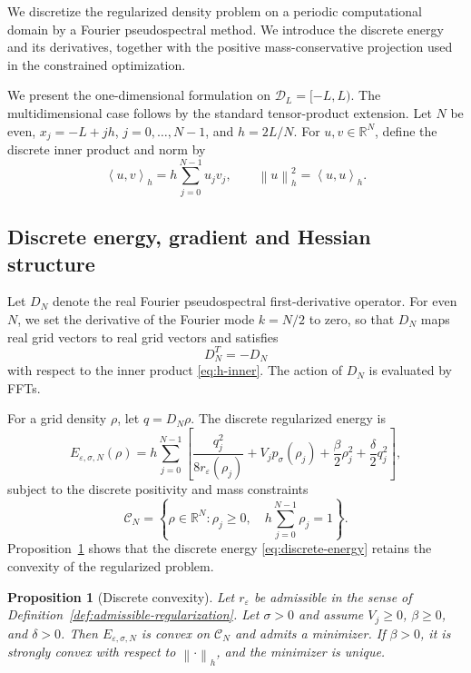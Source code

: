 \documentclass[11pt]{article}
\newcommand{\R}{\mathbb{R}}
\newcommand{\CN}{\mathcal{C}_N}
\newcommand{\eps}{\varepsilon}
\newcommand{\sig}{\sigma}
\newcommand{\inner}[2]{\left\langle #1,#2\right\rangle}
\newcommand{\norm}[1]{\left\|#1\right\|}
\theoremstyle{plain}
\newtheorem{proposition}[theorem]{Proposition}
\theoremstyle{definition}
\numberwithin{equation}{section}
\begin{document}
We discretize the regularized density problem on a periodic
computational domain by a Fourier pseudospectral method. We introduce
the discrete energy and its derivatives, together with the positive
mass-conservative projection used in the constrained optimization.

We present the one-dimensional formulation on $\mathcal D_L=[-L,L)$.
The multidimensional case follows by the standard tensor-product
extension. Let $N$ be even,
$x_j=-L+jh$, $j=0,\ldots,N-1$, and $h=2L/N$. For
$u,v\in\R^N$, define the discrete inner product and norm by
\begin{equation}
\label{eq:h-inner}
\inner{u}{v}_h
=
h\sum_{j=0}^{N-1}u_jv_j,
\qquad
\norm{u}_h^2=\inner{u}{u}_h.
\end{equation}


\subsection{Discrete energy, gradient and Hessian structure}

Let $D_N$ denote the real Fourier pseudospectral first-derivative
operator. For even $N$, we set the derivative of the Fourier mode
$k=N/2$ to zero, so that $D_N$ maps real grid vectors to real grid
vectors and satisfies
\begin{equation}
\label{eq:skew-adjoint}
D_N^T=-D_N
\end{equation}
with respect to the inner product \eqref{eq:h-inner}. The action of
$D_N$ is evaluated by FFTs.

For a grid density $\rho$, let $q=D_N\rho$. The discrete regularized
energy is
\begin{equation}
\label{eq:discrete-energy}
E_{\eps,\sig,N}(\rho)
=
h\sum_{j=0}^{N-1}
\left[
\frac{q_j^2}{8r_\eps(\rho_j)}
+V_jp_\sig(\rho_j)
+\frac{\beta}{2}\rho_j^2
+\frac{\delta}{2}q_j^2
\right],
\end{equation}
subject to the discrete positivity and mass constraints
\begin{equation}
\label{eq:discrete-feasible}
\CN
=
\left\{
\rho\in\R^N:
\rho_j\ge0,
\quad
h\sum_{j=0}^{N-1}\rho_j=1
\right\}.
\end{equation}
Proposition~\ref{prop:discrete-convex} shows that the discrete energy
\eqref{eq:discrete-energy} retains the convexity of the regularized
problem.

\begin{proposition}[Discrete convexity]
\label{prop:discrete-convex}
Let $r_\eps$ be admissible in the sense of
Definition~\ref{def:admissible-regularization}. Let $\sig>0$ and assume
$V_j\ge0$, $\beta\ge0$, and $\delta>0$.
Then $E_{\eps,\sig,N}$ is convex on $\CN$ and admits a minimizer.
If $\beta>0$, it is strongly convex with respect to
$\norm{\cdot}_h$, and the minimizer is unique.
\end{proposition}
\end{document}

